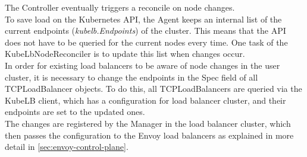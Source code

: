 The Controller eventually triggers a reconcile on node changes.
\\
To save load on the Kubernetes API, the Agent keeps an internal list of the current endpoints (\textit{kubelb.Endpoints}) of the cluster.
This means that the API does not have to be queried for the current nodes every time.
One task of the KubeLbNodeReconciler is to update this list when changes occur.
\\
In order for existing load balancers to be aware of node changes in the user cluster, it is necessary to change the endpoints in the Spec field of all TCPLoadBalancer objects.
To do this, all TCPLoadBalancers are queried via the KubeLB client, which has a configuration for load balancer cluster, and their endpoints are set to the updated ones.
\\
The changes are registered by the Manager in the load balancer cluster, which then passes the configuration to the Envoy load balancers as explained in more detail in \autoref{sec:envoy-control-plane}.
\\
